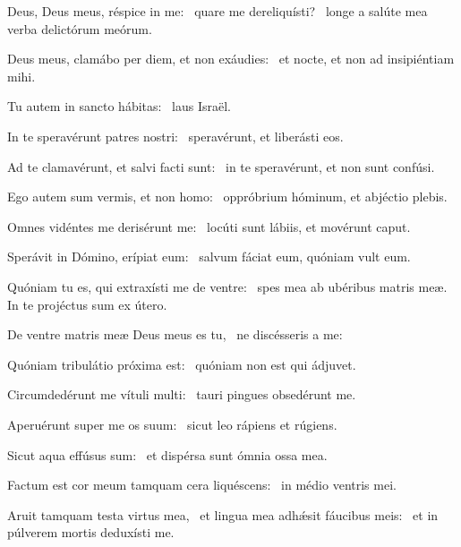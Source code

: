 \item Deus, Deus meus, réspice in me:~\pscross{} quare me dereliquísti?~\psstar{} longe a salúte mea verba delictórum meórum.

\item Deus meus, clamábo per diem, et non exáudies:~\psstar{} et nocte, et non ad insipiéntiam mihi.

\item Tu autem in sancto hábitas:~\psstar{} laus Israël.

\item In te speravérunt patres nostri:~\psstar{} speravérunt, et liberásti eos.

\item Ad te clamavérunt, et salvi facti sunt:~\psstar{} in te speravérunt, et non sunt confúsi.

\item Ego autem sum vermis, et non homo:~\psstar{} oppróbrium hóminum, et abjéctio plebis.

\item Omnes vidéntes me derisérunt me:~\psstar{} locúti sunt lábiis, et movérunt caput.

\item Sperávit in Dómino, erípiat eum:~\psstar{} salvum fáciat eum, quóniam vult eum.

\item Quóniam tu es, qui extraxísti me de ventre:~\psstar{} spes mea ab ubéribus matris meæ. In te projéctus sum ex útero.

\item De ventre matris meæ Deus meus es tu,~\psstar{} ne discésseris a me:

\item Quóniam tribulátio próxima est:~\psstar{} quóniam non est qui ádjuvet.

\item Circumdedérunt me vítuli multi:~\psstar{} tauri pingues obsedérunt me.

\item Aperuérunt super me os suum:~\psstar{} sicut leo rápiens et rúgiens.

\item Sicut aqua effúsus sum:~\psstar{} et dispérsa sunt ómnia ossa mea.

\item Factum est cor meum tamquam cera liquéscens:~\psstar{} in médio ventris mei.

\item Aruit tamquam testa virtus mea,~\pscross{} et lingua mea adhǽsit fáucibus meis:~\psstar{} et in púlverem mortis deduxísti me.

